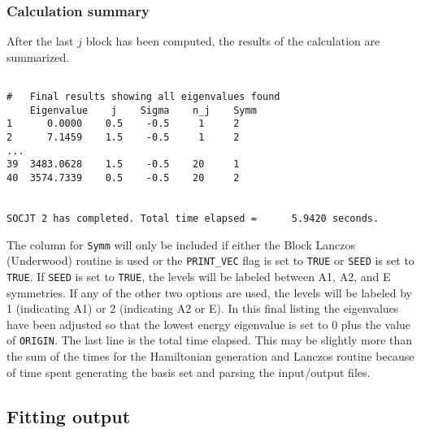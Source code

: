 \documentclass{article}
\begin{document}
\subsubsection{Calculation summary}
After the last $j$ block has been computed, the results of the
calculation are summarized.
\begin{verbatim} 

#	Final results showing all eigenvalues found
    Eigenvalue    j    Sigma    n_j    Symm
1      0.0000    0.5    -0.5     1     2
2      7.1459    1.5    -0.5     1     2
...
39  3483.0628    1.5    -0.5    20     1
40  3574.7339    0.5    -0.5    20     2

 
SOCJT 2 has completed. Total time elapsed =      5.9420 seconds.
\end{verbatim}
The column for {\tt Symm} will only be included if either the Block Lanczos (Underwood) routine is used or the {\tt PRINT\_VEC} flag is set to {\tt TRUE} or \texttt{SEED} is set to \texttt{TRUE}. If \texttt{SEED} is set to \texttt{TRUE}, the levels will be labeled between A1, A2, and E symmetries. If any of the other two options are used, the levels will be labeled by 1 (indicating A1) or 2 (indicating A2 or E). In this final listing the eigenvalues have been adjusted so that the lowest energy eigenvalue is set to 0 plus the value of {\tt ORIGIN}. The last line is the total time elapsed. This may be slightly more than the sum of the times for the Hamiltonian generation and Lanczos routine because of time spent generating the basis set and parsing the input/output files.

\subsection{Fitting output}
\end{document}
